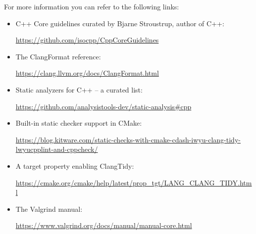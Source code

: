 For more information you can refer to the following links:

\begin{itemize}
\item 
C++ Core guidelines curated by Bjarne Stroustrup, author of C++: 

\url{https://github.com/isocpp/CppCoreGuidelines}

\item 
The ClangFormat reference: 

\url{https://clang.llvm.org/docs/ClangFormat.html}

\item 
Static analyzers for C++ – a curated list: 

\url{https://github.com/analysistools-dev/static-analysis\#cpp}

\item 
Built-in static checker support in CMake:

\url{https://blog.kitware.com/static-checks-with-cmake-cdash-iwyu-clang-tidy-lwyucpplint-and-cppcheck/}

\item 
A target property enabling ClangTidy:

\url{https://cmake.org/cmake/help/latest/prop\_tgt/LANG\_CLANG\_TIDY.html}

\item 
The Valgrind manual:

\url{https://www.valgrind.org/docs/manual/manual-core.html}
\end{itemize}